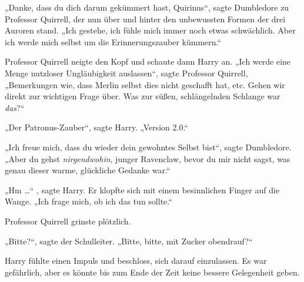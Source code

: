 „Danke, dass du dich darum gekümmert hast, Quirinus“, sagte Dumbledore zu Professor Quirrell, der nun über und hinter den unbewussten Formen der drei Auroren stand.
„Ich gestehe, ich fühle mich immer noch etwas schwächlich. Aber ich werde mich selbst um die Erinnerungszauber kümmern.“

Professor Quirrell neigte den Kopf und schaute dann Harry an.
„Ich werde eine Menge nutzloser Ungläubigkeit auslassen“, sagte Professor Quirrell,
„Bemerkungen wie, dass Merlin selbst dies nicht geschafft hat, etc. Gehen wir direkt zur wichtigen Frage über. Was zur süßen, schlängelnden Schlange war \emph{das}?“

„Der Patronus-Zauber“, sagte Harry.
„Version 2.0.“

„Ich freue mich, dass du wieder dein gewohntes Selbst bist“, sagte Dumbledore.
„Aber du gehst \emph{nirgendwohin}, junger Ravenclaw, bevor du mir nicht sagst, was genau dieser warme, glückliche Gedanke war.“

„Hm …“ , sagte Harry. Er klopfte sich mit einem besinnlichen Finger auf die Wange.
„Ich frage mich, ob ich das tun sollte.“

Professor Quirrell grinste plötzlich.

„Bitte?“, sagte der Schulleiter.
„Bitte, bitte, mit Zucker obendrauf?“

Harry fühlte einen Impuls und beschloss, sich darauf einzulassen. Es war gefährlich, aber es könnte bis zum Ende der Zeit keine bessere Gelegenheit geben.


